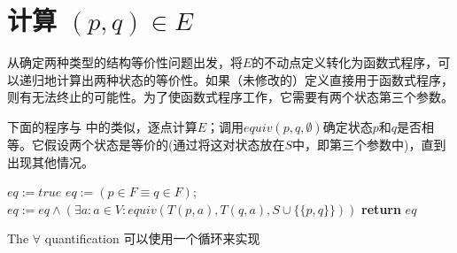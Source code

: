 \section{计算 $ (p,q) \in E $}

从确定两种类型的结构等价性问题出发，将$E$的不动点定义转化为函数式程序，可以递归地计算出两种状态的等价性。如果（未修改的）定义直接用于函数式程序，则有无法终止的可能性。为了使函数式程序工作，它需要有两个状态第三个参数。

下面的程序与 \cite{t-Ei91} 中的类似，逐点计算$E$；调用$equiv(p,q,\emptyset)$确定状态$p$和$q$是否相等。它假设两个状态是等价的(通过将这对状态放在$S$中，即第三个参数中)，直到出现其他情况。

\begin{algorithm}
    \small
    \begin{algorithmic}[1]
                $eq := true$
                \State $ eq := ( p \in F \equiv q \in F ) $;
                \State $ eq := eq \land (\exists a:a \in V : equiv (T(p,a),T(q,a),S \cup \{ \{ p,q\} \}  ) )  $
            \EndIf
            \State \textbf{return} $eq$
        \EndFunction
    \end{algorithmic}
\end{algorithm}


\newpage
The $\forall$ quantification 可以使用一个循环来实现

